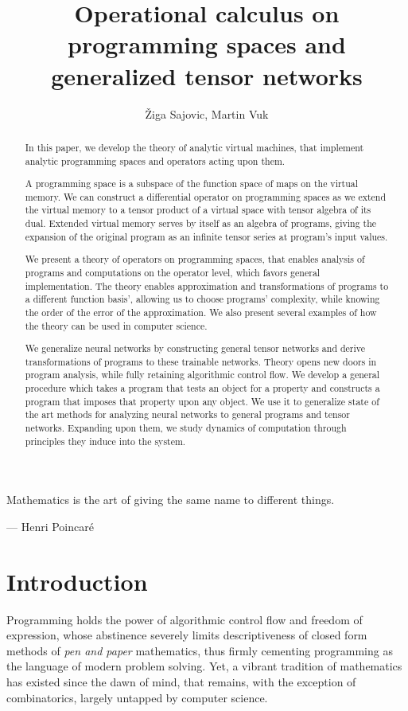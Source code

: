 \documentclass{article}
\title{Operational calculus on programming spaces and generalized tensor networks}
\author{Žiga Sajovic, Martin Vuk}
\begin{document}
\maketitle
\begin{abstract}
In this paper, we develop the theory of analytic virtual machines, that
implement analytic programming spaces and operators acting upon them.

A programming space is a subspace of the function space of maps on the virtual
memory. We can construct a differential operator on programming spaces as we 
extend the virtual memory to a tensor product of a virtual space with tensor algebra
of its dual. Extended virtual memory serves by itself as an algebra of programs, giving the expansion of the original program as an infinite tensor series at
program's input values. 

We present a theory of operators on programming spaces, that enables analysis of programs
and computations on the operator level, which favors general implementation. The theory enables
approximation and transformations of programs to a different function basis', allowing us to choose programs' complexity, 
while knowing the order of the error of the approximation. We
also present several examples of how the theory can be used in computer science.

We generalize neural networks by constructing general tensor networks and derive transformations of programs to these trainable networks.
Theory opens new doors in program analysis, while fully retaining algorithmic control flow. We develop a general
procedure which takes a program that tests an object for a property and
constructs a program that imposes that property upon any object. 
We use it to generalize state of the art methods for analyzing neural networks to general programs and tensor networks. Expanding upon them, we study dynamics of computation through principles they induce into the system.

\end{abstract}

\epigraph{Mathematics is the art of giving the same name to different things.}{--- \textup{Henri Poincaré}}


\clearpage
\tableofcontents

\section{Introduction}
Programming holds the power of algorithmic control flow and freedom of expression, whose abstinence severely limits descriptiveness of closed form methods of \textit{pen and paper} mathematics, thus firmly cementing programming as the language of modern problem solving. Yet, a vibrant tradition of mathematics has existed since the dawn of mind, that remains, with the exception of combinatorics, largely untapped by computer science. 
\end{document}
